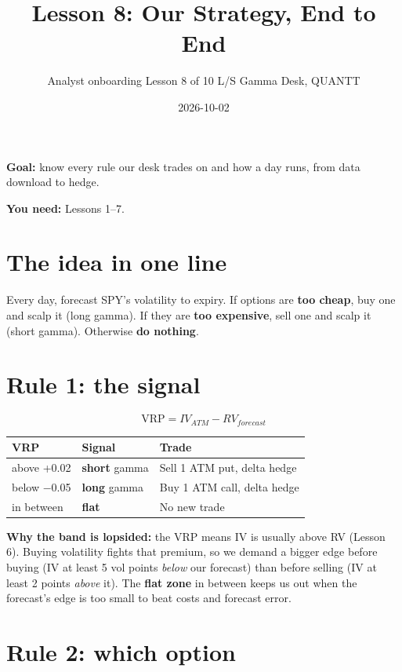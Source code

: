 \documentclass{article}
\title{Lesson 8: Our Strategy, End to End}
\author{Analyst onboarding \textperiodcentered{} Lesson 8 of 10 \textperiodcentered{} L/S Gamma Desk, QUANTT}
\date{2026-10-02}
\begin{document}
\maketitle

\textbf{Goal:} know every rule our desk trades on and how a day runs, from data download to hedge.

\textbf{You need:} Lessons 1--7.

\section{The idea in one line}

Every day, forecast SPY's volatility to expiry. If options are \textbf{too cheap}, buy one and scalp it (long gamma). If they are \textbf{too expensive}, sell one and scalp it (short gamma). Otherwise \textbf{do nothing}.

\section{Rule 1: the signal}

\[\text{VRP} = IV_{ATM} - RV_{forecast}\]

\begin{center}\small
\begin{tabularx}{\linewidth}{l >{\raggedright\arraybackslash}X >{\raggedright\arraybackslash}X}
\toprule
\textbf{VRP} & \textbf{Signal} & \textbf{Trade} \\
\midrule
above +0.02 & \textbf{short} gamma & Sell 1 ATM put, delta hedge \\
below \ensuremath{-}0.05 & \textbf{long} gamma & Buy 1 ATM call, delta hedge \\
in between & \textbf{flat} & No new trade \\
\bottomrule
\end{tabularx}
\end{center}

\textbf{Why the band is lopsided:} the VRP means IV is usually above RV (Lesson 6). Buying volatility fights that premium, so we demand a bigger edge before buying (IV at least 5 vol points \emph{below} our forecast) than before selling (IV at least 2 points \emph{above} it). The \textbf{flat zone} in between keeps us out when the forecast's edge is too small to beat costs and forecast error.

\section{Rule 2: which option}
\end{document}
